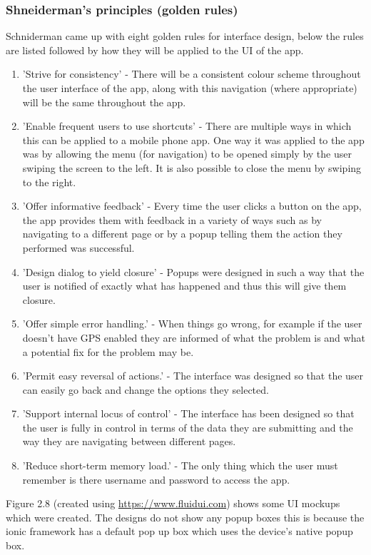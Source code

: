 \subsubsection{Shneiderman's principles (golden rules)}
Schniderman came up with eight golden rules for interface design, below the rules are listed followed by how they will be applied to the UI of the app. \cite{sch}
\begin{enumerate}
	\item 'Strive for consistency' - There will be a consistent colour scheme throughout the user interface of the app, along with this navigation (where appropriate) will be the same throughout the app.
	\item 'Enable frequent users to use shortcuts' - There are multiple ways in which this can be applied to a mobile phone app. One way it was applied to the app was by allowing the menu (for navigation) to be opened simply by the user swiping the screen to the left. It is also possible to close the menu by swiping to the right.
	\item 'Offer informative feedback' - Every time the user clicks a button on the app, the app provides them with feedback in a variety of ways such as by navigating to a different page or by a popup telling them the action they performed was successful.
	\item 'Design dialog to yield closure' - Popups were designed in such a way that the user is notified of exactly what has happened and thus this will give them closure.
	\item 'Offer simple error handling.' - When things go wrong, for example if the user doesn't have GPS enabled they are informed of what the problem is and what a potential fix for the problem may be.
	\item 'Permit easy reversal of actions.' - The interface was designed so that the user can easily go back and change the options they selected.
	\item 'Support internal locus of control' - The interface has been designed so that the user is fully in control in terms of the data they are submitting and the way they are navigating between different pages.
	\item 'Reduce short-term memory load.' - The only thing which the user must remember is there username and password to access the app.
\end{enumerate}
Figure 2.8 (created using \url {https://www.fluidui.com}) shows some UI mockups which were created. The designs do not show any popup boxes this is because the ionic framework has a default pop up box which uses the device's native popup box.
